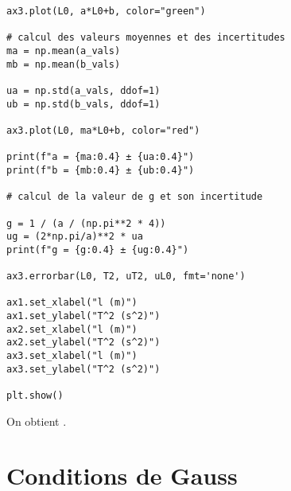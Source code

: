 \documentclass[a4paper]{report}
\begin{document}
\begin{verbatim}
ax3.plot(L0, a*L0+b, color="green")

# calcul des valeurs moyennes et des incertitudes
ma = np.mean(a_vals)
mb = np.mean(b_vals)

ua = np.std(a_vals, ddof=1)
ub = np.std(b_vals, ddof=1)

ax3.plot(L0, ma*L0+b, color="red")

print(f"a = {ma:0.4} ± {ua:0.4}")
print(f"b = {mb:0.4} ± {ub:0.4}")

# calcul de la valeur de g et son incertitude

g = 1 / (a / (np.pi**2 * 4))
ug = (2*np.pi/a)**2 * ua
print(f"g = {g:0.4} ± {ug:0.4}")

ax3.errorbar(L0, T2, uT2, uL0, fmt='none')

ax1.set_xlabel("l (m)")
ax1.set_ylabel("T^2 (s^2)")
ax2.set_xlabel("l (m)")
ax2.set_ylabel("T^2 (s^2)")
ax3.set_xlabel("l (m)")
ax3.set_ylabel("T^2 (s^2)")

plt.show()
	\end{verbatim}

	On obtient .

	\begin{figure}[H]
		\centering
		
	\end{figure}

	\section{Conditions de Gauss}
\end{document}
